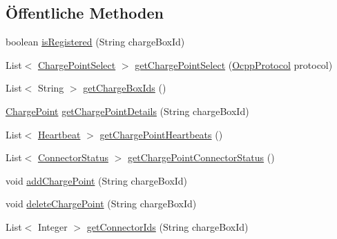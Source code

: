 \subsection*{Öffentliche Methoden}
\begin{DoxyCompactItemize}
\item 
boolean \hyperlink{interfacede_1_1rwth_1_1idsg_1_1steve_1_1repository_1_1_charge_point_repository_a4824062c6ff2dfcf9490ffb71484bb83}{is\-Registered} (String charge\-Box\-Id)
\item 
List$<$ \hyperlink{classde_1_1rwth_1_1idsg_1_1steve_1_1repository_1_1dto_1_1_charge_point_select}{Charge\-Point\-Select} $>$ \hyperlink{interfacede_1_1rwth_1_1idsg_1_1steve_1_1repository_1_1_charge_point_repository_ad8617028d70a274b51b9fe7d04feee72}{get\-Charge\-Point\-Select} (\hyperlink{enumde_1_1rwth_1_1idsg_1_1steve_1_1ocpp_1_1_ocpp_protocol}{Ocpp\-Protocol} protocol)
\item 
List$<$ String $>$ \hyperlink{interfacede_1_1rwth_1_1idsg_1_1steve_1_1repository_1_1_charge_point_repository_a0f9a9d616c82118e9292f1dd0bb8fd5e}{get\-Charge\-Box\-Ids} ()
\item 
\hyperlink{classde_1_1rwth_1_1idsg_1_1steve_1_1repository_1_1dto_1_1_charge_point}{Charge\-Point} \hyperlink{interfacede_1_1rwth_1_1idsg_1_1steve_1_1repository_1_1_charge_point_repository_ad1d4fa42c668f642dc67777b91ae0d4c}{get\-Charge\-Point\-Details} (String charge\-Box\-Id)
\item 
List$<$ \hyperlink{classde_1_1rwth_1_1idsg_1_1steve_1_1repository_1_1dto_1_1_heartbeat}{Heartbeat} $>$ \hyperlink{interfacede_1_1rwth_1_1idsg_1_1steve_1_1repository_1_1_charge_point_repository_a4cd918698edd78ff3e5e02e0374f602d}{get\-Charge\-Point\-Heartbeats} ()
\item 
List$<$ \hyperlink{classde_1_1rwth_1_1idsg_1_1steve_1_1repository_1_1dto_1_1_connector_status}{Connector\-Status} $>$ \hyperlink{interfacede_1_1rwth_1_1idsg_1_1steve_1_1repository_1_1_charge_point_repository_ab1beb661ec11861ebaf2e43b003cb6d8}{get\-Charge\-Point\-Connector\-Status} ()
\item 
void \hyperlink{interfacede_1_1rwth_1_1idsg_1_1steve_1_1repository_1_1_charge_point_repository_ac53c29634d138c29d7afd53805f09260}{add\-Charge\-Point} (String charge\-Box\-Id)
\item 
void \hyperlink{interfacede_1_1rwth_1_1idsg_1_1steve_1_1repository_1_1_charge_point_repository_a328b7bcc93f78214de31e6deb71d3730}{delete\-Charge\-Point} (String charge\-Box\-Id)
\item 
List$<$ Integer $>$ \hyperlink{interfacede_1_1rwth_1_1idsg_1_1steve_1_1repository_1_1_charge_point_repository_aed97e9bbcfd11a66f6e86bc52e51cbd5}{get\-Connector\-Ids} (String charge\-Box\-Id)
\end{DoxyCompactItemize}


